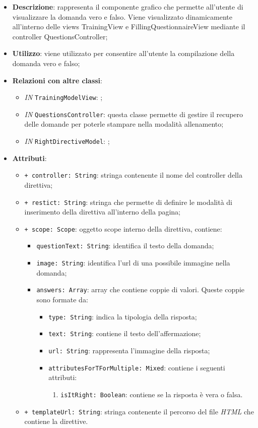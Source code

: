 		\begin{itemize}
			\item \textbf{Descrizione}: rappresenta il componente grafico che permette all'utente di visualizzare la domanda vero e falso. Viene visualizzato dinamicamente all'interno delle views TrainingView e FillingQuestionnaireView mediante il controller QuestionsController;
			\item \textbf{Utilizzo}: viene utilizzato per consentire all'utente la compilazione della domanda vero e falso;
			\item \textbf{Relazioni con altre classi}: 
			\begin{itemize}
				\item \textit{IN} \texttt{TrainingModelView}: ; 
				\item \textit{IN} \texttt{QuestionsController}: questa classe permette di gestire il recupero delle domande per poterle stampare nella modalità allenamento;
				\item \textit{IN} \texttt{RightDirectiveModel}: ;
			\end{itemize}
			\item \textbf{Attributi}: 
			\begin{itemize}
				\item \texttt{+ controller: String}: stringa contenente il nome del controller della direttiva;
				\item \texttt{+ restict: String}: stringa che permette di definire le modalità di inserimento della direttiva all'interno della pagina;
				\item \texttt{+ scope: Scope}: oggetto scope interno della direttiva, contiene:
				\begin{itemize}
					\item \texttt{questionText: String}: identifica il testo della domanda;
					\item \texttt{image: String}: identifica l'url di una possibile immagine nella domanda;
					\item \texttt{answers: Array}: array che contiene coppie di valori. Queste coppie sono formate da:
					\begin{itemize}
						\item \texttt{type: String}: indica la tipologia della risposta;
						\item \texttt{text: String}: contiene il testo dell'affermazione;
						\item \texttt{url: String}: rappresenta l'immagine della risposta;
						\item \texttt{attributesForTForMultiple: Mixed}: contiene i seguenti attributi:
						\begin{enumerate}
							\item \texttt{isItRight: Boolean}: contiene se la risposta è vera o falsa.
						\end{enumerate}
					\end{itemize}
				\end{itemize}
				\item \texttt{+ templateUrl: String}: stringa contenente il percorso del file \textit{HTML} che contiene la direttive.
			\end{itemize}
		\end{itemize}																	